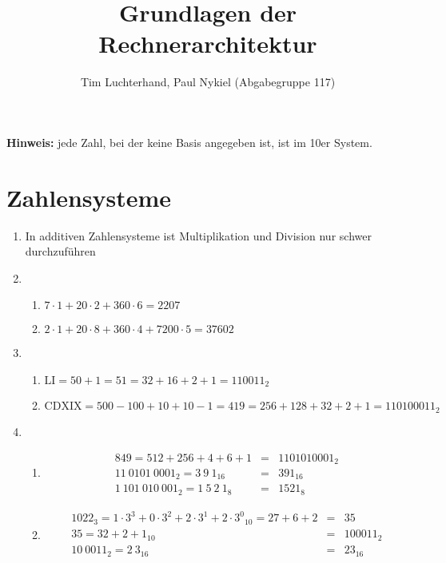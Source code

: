 \documentclass[DIN, pagenumber=false, fontsize=11pt, parskip=half]{scrartcl}
\title{Grundlagen der Rechnerarchitektur}
\author{Tim Luchterhand, Paul Nykiel (Abgabegruppe 117)}
\begin{document}
    \maketitle
    \textbf{Hinweis: } jede Zahl, bei der keine Basis angegeben ist, ist im 10er System.
    \section{Zahlensysteme}
    \begin{enumerate}
        \item In additiven Zahlensysteme ist Multiplikation und Division nur schwer durchzuführen
        \item 
            \begin{enumerate}
                \item $7 \cdot 1 + 20 \cdot 2 + 360 \cdot 6 = 2207$
                \item $2 \cdot 1 + 20 \cdot 8 + 360 \cdot 4 + 7200 \cdot 5 = 37602$
            \end{enumerate}
        \item 
            \begin{enumerate}
                \item $\text{LI} = 50 + 1 = 51 = 32 + 16 + 2 + 1 = {110011}_2$
                \item $\text{CDXIX} = 500 - 100 + 10 + 10 - 1 = 419 = 256 + 128 + 32 + 2 + 1 = {110100011}_2$
            \end{enumerate}
        \item 
            \begin{enumerate}
                \item 
                    \begin{eqnarray*}
                        849 = 512 + 256 + 4 + 6 + 1 &=& {1101010001}_2 \\
                        {11\ 0101\ 0001}_2 = {3\ 9\ 1}_{16} &=& {391}_{16}\\
                        {1\ 101\ 010\ 001}_2 = {1\ 5\ 2\ 1}_{8} &=& {1521}_8
                    \end{eqnarray*}
                \item 
                    \begin{eqnarray*}
                        {1022}_{3} = {1 \cdot 3^3 + 0 \cdot 3^2 + 2 \cdot 3^1 + 2 \cdot 3^0}_{10} = 27 + 6 + 2 &=& 35\\
                        35 = {32 + 2 + 1}_{10} &=& {100011}_{2}\\
                        {10\ 0011}_2 = {2\ 3}_{16} &=& {23}_{16} \\

\end{eqnarray*}
\end{enumerate}
\end{enumerate}
\end{document}

